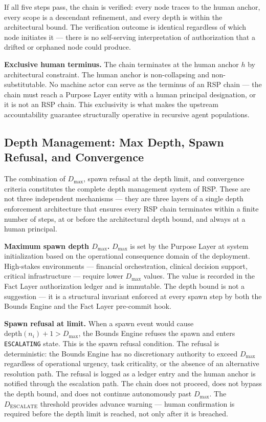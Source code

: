If all five steps pass, the chain is verified: every node traces to the human anchor, every scope is a descendant refinement, and every depth is within the architectural bound. The verification outcome is identical regardless of which node initiates it — there is no self-serving interpretation of authorization that a drifted or orphaned node could produce.

\medskip
\noindent\textbf{Exclusive human terminus.} The chain terminates at the human anchor $h$ by architectural constraint. The human anchor is non-collapsing and non-substitutable. No machine actor can serve as the terminus of an RSP chain — the chain must reach a Purpose Layer entity with a human principal designation, or it is not an RSP chain. This exclusivity is what makes the \bxthree{} upstream accountability guarantee structurally operative in recursive agent populations.

\subsection{Depth Management: Max Depth, Spawn Refusal, and Convergence}
\label{sec:rs-depth-management}

The combination of $D_{\max}$, spawn refusal at the depth limit, and convergence criteria constitutes the complete depth management system of RSP. These are not three independent mechanisms — they are three layers of a single depth enforcement architecture that ensures every RSP chain terminates within a finite number of steps, at or before the architectural depth bound, and always at a human principal.

\medskip
\noindent\textbf{Maximum spawn depth $D_{\max}$.} $D_{\max}$ is set by the Purpose Layer at system initialization based on the operational consequence domain of the deployment. High-stakes environments — financial orchestration, clinical decision support, critical infrastructure — require lower $D_{\max}$ values. The value is recorded in the Fact Layer authorization ledger and is immutable. The depth bound is not a suggestion — it is a structural invariant enforced at every spawn step by both the Bounds Engine and the Fact Layer pre-commit hook.

\medskip
\noindent\textbf{Spawn refusal at limit.} When a spawn event would cause $\text{depth}(n_i) + 1 > D_{\max}$, the Bounds Engine refuses the spawn and enters \texttt{ESCALATING} state. This is the spawn refusal condition. The refusal is deterministic: the Bounds Engine has no discretionary authority to exceed $D_{\max}$ regardless of operational urgency, task criticality, or the absence of an alternative resolution path. The refusal is logged as a ledger entry and the human anchor is notified through the escalation path. The chain does not proceed, does not bypass the depth bound, and does not continue autonomously past $D_{\max}$. The $D_{\text{ESCALATE}}$ threshold provides advance warning — human confirmation is required before the depth limit is reached, not only after it is breached.

